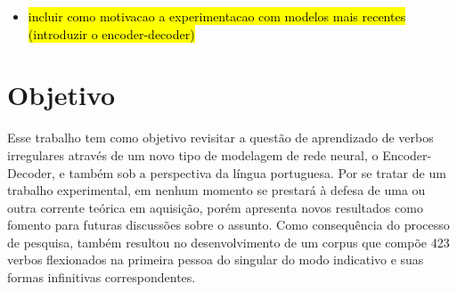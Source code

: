 \begin{itemize}
    \item \hl{incluir como motivacao a experimentacao com modelos mais recentes (introduzir o encoder-decoder)}
\end{itemize}


\section{Objetivo}
\label{sec:objectives}

Esse trabalho tem como objetivo revisitar a questão de aprendizado de verbos irregulares através de um novo tipo de modelagem de rede neural, o Encoder-Decoder, e também sob a perspectiva da língua portuguesa. Por se tratar de um trabalho experimental, em nenhum momento se prestará à defesa de uma ou outra corrente teórica em aquisição, porém apresenta novos resultados como fomento para futuras discussões sobre o assunto. Como consequência do processo de pesquisa, também resultou no desenvolvimento de um corpus que compõe 423 verbos flexionados na primeira pessoa do singular do modo indicativo e suas formas infinitivas correspondentes. 


